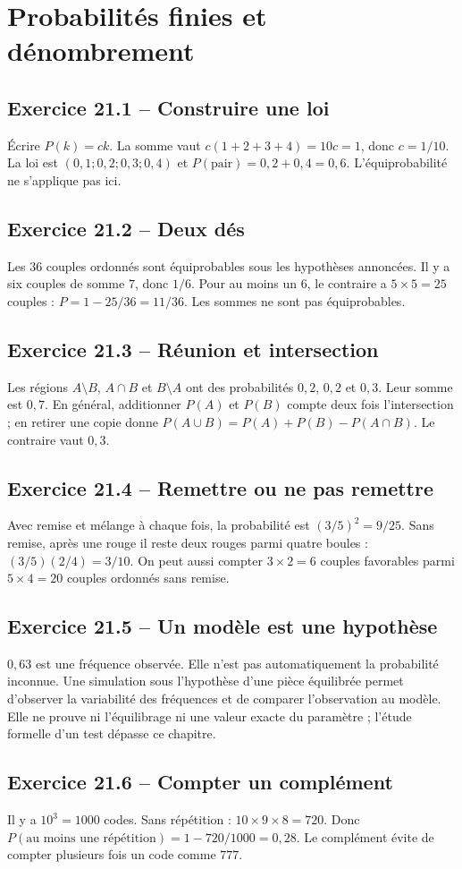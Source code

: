 \chapter{Probabilités finies et dénombrement}
\section*{Exercice 21.1 -- Construire une loi}
Écrire $P(k)=ck$. La somme vaut $c(1+2+3+4)=10c=1$, donc $c=1/10$. La loi est $(0{,}1;0{,}2;0{,}3;0{,}4)$ et $P(\text{pair})=0{,}2+0{,}4=0{,}6$. L'équiprobabilité ne s'applique pas ici.

\section*{Exercice 21.2 -- Deux dés}
Les $36$ couples ordonnés sont équiprobables sous les hypothèses annoncées. Il y a six couples de somme $7$, donc $1/6$. Pour au moins un $6$, le contraire a $5\times5=25$ couples : $P=1-25/36=11/36$. Les sommes ne sont pas équiprobables.

\section*{Exercice 21.3 -- Réunion et intersection}
Les régions $A\setminus B$, $A\cap B$ et $B\setminus A$ ont des probabilités $0{,}2$, $0{,}2$ et $0{,}3$. Leur somme est $0{,}7$. En général, additionner $P(A)$ et $P(B)$ compte deux fois l'intersection ; en retirer une copie donne $P(A\cup B)=P(A)+P(B)-P(A\cap B)$. Le contraire vaut $0{,}3$.

\section*{Exercice 21.4 -- Remettre ou ne pas remettre}
Avec remise et mélange à chaque fois, la probabilité est $(3/5)^2=9/25$. Sans remise, après une rouge il reste deux rouges parmi quatre boules : $(3/5)(2/4)=3/10$. On peut aussi compter $3\times2=6$ couples favorables parmi $5\times4=20$ couples ordonnés sans remise.

\section*{Exercice 21.5 -- Un modèle est une hypothèse}
$0{,}63$ est une fréquence observée. Elle n'est pas automatiquement la probabilité inconnue. Une simulation sous l'hypothèse d'une pièce équilibrée permet d'observer la variabilité des fréquences et de comparer l'observation au modèle. Elle ne prouve ni l'équilibrage ni une valeur exacte du paramètre ; l'étude formelle d'un test dépasse ce chapitre.

\section*{Exercice 21.6 -- Compter un complément}
Il y a $10^3=1000$ codes. Sans répétition : $10\times9\times8=720$. Donc $P(\text{au moins une répétition})=1-720/1000=0{,}28$. Le complément évite de compter plusieurs fois un code comme $777$.
